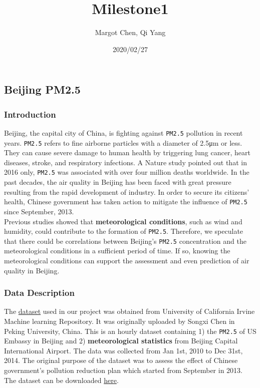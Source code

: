 \documentclass[]{article}
\title{Milestone1}
\author{Margot Chen, Qi Yang}
\date{2020/02/27}
\begin{document}
\maketitle

\hypertarget{beijing-pm2.5}{%
\subsection{Beijing PM2.5}\label{beijing-pm2.5}}

\hypertarget{introduction}{%
\subsubsection{Introduction}\label{introduction}}

Beijing, the capital city of China, is fighting against \texttt{PM2.5}
pollution in recent years. \texttt{PM2.5} refers to fine airborne
particles with a diameter of 2.5μm or less. They can cause severe damage
to human health by triggering lung cancer, heart diseases, stroke, and
respiratory infections. A Nature study pointed out that in 2016 only,
\texttt{PM2.5} was associated with over four million deaths worldwide.
In the past decades, the air quality in Beijing has been faced with
great pressure resulting from the rapid development of industry. In
order to secure its citizens' health, Chinese government has taken
action to mitigate the influence of \texttt{PM2.5} since September,
2013.\\
Previous studies showed that \textbf{meteorological conditions}, such as
wind and humidity, could contribute to the formation of \texttt{PM2.5}.
Therefore, we speculate that there could be correlations between
Beijing's \texttt{PM2.5} concentration and the meteorological conditions
in a sufficient period of time. If so, knowing the meteorological
conditions can support the assessment and even prediction of air quality
in Beijing.

\hypertarget{data-description}{%
\subsubsection{Data Description}\label{data-description}}

The
\href{https://archive.ics.uci.edu/ml/datasets/Beijing+PM2.5+Data\#}{dataset}
used in our project was obtained from University of California Irvine
Machine learning Repository. It was originally uploaded by Songxi Chen
in Peking University, China. This is an hourly dataset containing 1) the
\texttt{PM2.5} of US Embassy in Beijing and 2) \textbf{meteorological
statistics} from Beijing Capital International Airport. The data was
collected from Jan 1st, 2010 to Dec 31st, 2014. The original purpose of
the dataset was to assess the effect of Chinese government's pollution
reduction plan which started from September in 2013. The dataset can be
downloaded
\href{https://archive.ics.uci.edu/ml/machine-learning-databases/00381/PRSA_data_2010.1.1-2014.12.31.csv}{here}.
\end{document}
